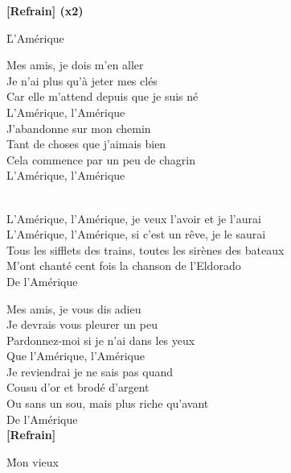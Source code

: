 \documentclass{novel}
\begin{document}
\textbf{[Refrain] (x2)}

\newpage
\large

\h*{L’Amérique}

Mes amis, je dois m'en aller \\
Je n'ai plus qu'à jeter mes clés \\
Car elle m'attend depuis que je suis né \\
L'Amérique, l’Amérique \\

J'abandonne sur mon chemin \\
Tant de choses que j'aimais bien \\
Cela commence par un peu de chagrin \\
L'Amérique, l’Amérique \\

\begin{bfseries}
[Refrain:]\\
L'Amérique, l'Amérique, je veux l'avoir et je l'aurai \\
L'Amérique, l'Amérique, si c'est un rêve, je le saurai \\
Tous les sifflets des trains, toutes les sirènes des bateaux \\
M'ont chanté cent fois la chanson de l'Eldorado \\
De l'Amérique \\
\end{bfseries}

Mes amis, je vous dis adieu \\
Je devrais vous pleurer un peu \\
Pardonnez-moi si je n'ai dans les yeux \\
Que l'Amérique, l’Amérique \\

Je reviendrai je ne sais pas quand \\
Cousu d'or et brodé d'argent \\
Ou sans un sou, mais plus riche qu'avant \\
De l'Amérique \\

\textbf{[Refrain]}


\newpage
\normalsize

\h*{Mon vieux}
\end{document}
